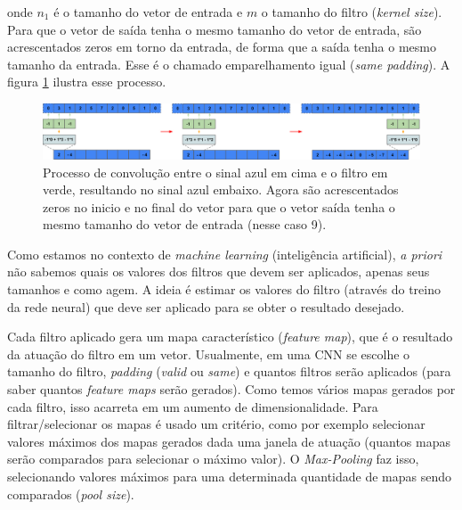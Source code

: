 \documentclass[a4paper,12pt,oneside]{book}
\begin{document}
\par onde $n_1$ é o tamanho do vetor de entrada e $m$ o tamanho do filtro (\textit{kernel size}). Para que o vetor de saída tenha o mesmo tamanho do vetor de entrada, são acrescentados zeros em torno da entrada, de forma que a saída tenha o mesmo tamanho da entrada. Esse é o chamado emparelhamento igual (\textit{same padding}). A figura \ref{fig:conv_same} ilustra esse processo.

\begin{figure}[H]
    \centering
    \includegraphics[scale = 0.33]{figs/conv_same.png}
    \caption{Processo de convolução entre o sinal azul em cima e o filtro em verde, resultando no sinal azul embaixo. Agora são acrescentados zeros no inicio e no final do vetor para que o vetor saída tenha o mesmo tamanho do vetor de entrada (nesse caso 9).}
    \label{fig:conv_same}
\end{figure}
\par Como estamos no contexto de \textit{machine learning} (inteligência artificial), \textit{a priori} não sabemos quais os valores dos filtros que devem ser aplicados, apenas seus tamanhos e como agem. A ideia é estimar os valores do filtro (através do treino da rede neural) que deve ser aplicado para se obter o resultado desejado.

\par Cada filtro aplicado gera um mapa característico (\textit{feature map}), que é o resultado da atuação do filtro em um vetor. Usualmente, em uma CNN se escolhe o tamanho do filtro, \textit{padding} (\textit{valid} ou \textit{same}) e quantos filtros serão aplicados (para saber quantos \textit{feature maps} serão gerados). Como temos vários mapas gerados por cada filtro, isso acarreta em um aumento de dimensionalidade. Para filtrar/selecionar os mapas é usado um critério, como por exemplo selecionar valores máximos dos mapas gerados dada uma janela de atuação (quantos mapas serão comparados para selecionar o máximo valor). O \textit{Max-Pooling} faz isso, selecionando valores máximos para uma determinada quantidade de mapas sendo comparados (\textit{pool size}).

\end{document}
